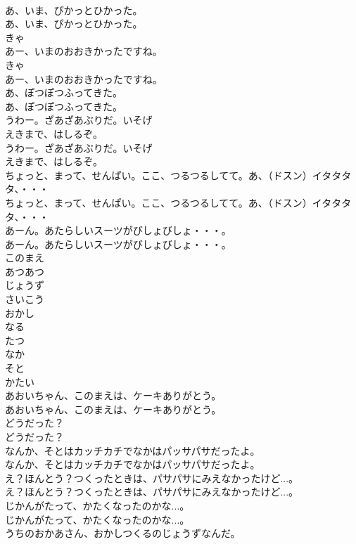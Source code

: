 \documentclass[8pt]{extreport}
\begin{document}
\begin{CJK}{UTF8}{min}
\\	あ、いま、ぴかっとひかった。
\\	あ、いま、ぴかっとひかった。
\\	きゃ
\\	あー、いまのおおきかったですね。
\\	きゃ
\\	あー、いまのおおきかったですね。
\\	あ、ぽつぽつふってきた。
\\	あ、ぽつぽつふってきた。
\\	うわー。ざあざあぶりだ。いそげ
\\	えきまで、はしるぞ。
\\	うわー。ざあざあぶりだ。いそげ
\\	えきまで、はしるぞ。
\\	ちょっと、まって、せんぱい。ここ、つるつるしてて。あ、（ドスン）イタタタタ、・・・
\\	ちょっと、まって、せんぱい。ここ、つるつるしてて。あ、（ドスン）イタタタタ、・・・
\\	あーん。あたらしいスーツがびしょびしょ・・・。
\\	あーん。あたらしいスーツがびしょびしょ・・・。
\\	このまえ
\\	あつあつ
\\	じょうず
\\	さいこう
\\	おかし
\\	なる
\\	たつ
\\	なか
\\	そと
\\	かたい
\\	あおいちゃん、このまえは、ケーキありがとう。
\\	あおいちゃん、このまえは、ケーキありがとう。
\\	どうだった？
\\	どうだった？
\\	なんか、そとはカッチカチでなかはパッサパサだったよ。
\\	なんか、そとはカッチカチでなかはパッサパサだったよ。
\\	え？ほんとう？つくったときは、パサパサにみえなかったけど...。
\\	え？ほんとう？つくったときは、パサパサにみえなかったけど...。
\\	じかんがたって、かたくなったのかな...。
\\	じかんがたって、かたくなったのかな...。
\\	うちのおかあさん、おかしつくるのじょうずなんだ。

\end{CJK}
\end{document}
